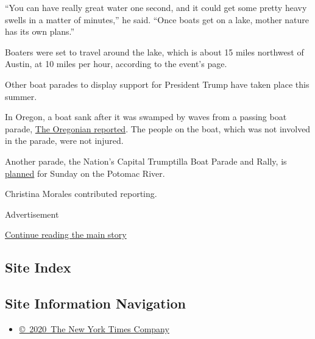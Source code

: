 ``You can have really great water one second, and it could get some
pretty heavy swells in a matter of minutes,'' he said. ``Once boats get
on a lake, mother nature has its own plans.''

Boaters were set to travel around the lake, which is about 15 miles
northwest of Austin, at 10 miles per hour, according to the event's
page.

Other boat parades to display support for President Trump have taken
place this summer.

In Oregon, a boat sank after it was swamped by waves from a passing boat
parade,
\href{https://www.oregonlive.com/portland/2020/08/boat-sinks-on-willamette-river-as-trump-boat-parade-passes-by.html}{The
Oregonian reported}. The people on the boat, which was not involved in
the parade, were not injured.

Another parade, the Nation's Capital Trumptilla Boat Parade and Rally,
is
\href{https://www.facebookcorewwwi.onion/events/735121180393420/?active_tab=about}{planned}
for Sunday on the Potomac River.

Christina Morales contributed reporting.

Advertisement

\protect\hyperlink{after-bottom}{Continue reading the main story}

\hypertarget{site-index}{%
\subsection{Site Index}\label{site-index}}

\hypertarget{site-information-navigation}{%
\subsection{Site Information
Navigation}\label{site-information-navigation}}

\begin{itemize}
\tightlist
\item
  \href{https://help.nytimes3xbfgragh.onion/hc/en-us/articles/115014792127-Copyright-notice}{©~2020~The
  New York Times Company}
\end{itemize}

